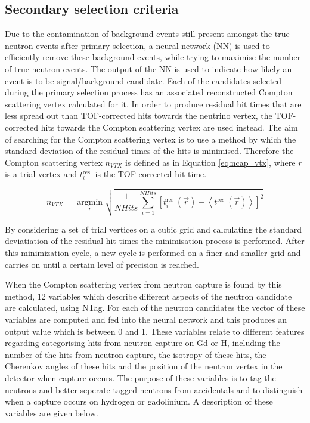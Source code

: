 \subsection{Secondary selection criteria}
Due to the contamination of background events still present amongst the true neutron events after primary selection, a neural network (NN) is used to efficiently remove these background events, while trying to maximise the number of true neutron events. The output of the NN is used to indicate how likely an event is to be signal/background candidate. Each of the candidates selected during the primary selection process has an associated reconstructed Compton scattering vertex calculated for it. In order to produce residual hit times that are less spread out than TOF-corrected hits towards the neutrino vertex, the TOF-corrected hits towards the Compton scattering vertex are used instead. The aim of searching for the Compton scattering vertex is to use a method by which the standard deviation of the residual times of the hits is minimised. Therefore the Compton scattering vertex $n_{VTX}$ is defined as in Equation \ref{eq:ncap_vtx}, where $r$ is a trial vertex and $t_i^{\text {res }}$ is the TOF-corrected hit time.

\begin{equation}
    n_{VTX}=\underset{r}{\operatorname{argmin}}\sqrt{\frac{1}{NHits} \sum_{i=1}^{NHits}\left[t_i^{\text {res }}(\vec{r})-\left\langle t^{\text {res }}(\vec{r})\right\rangle\right]^2}
\label{eq:ncap_vtx}
\end{equation}

 

By considering a set of trial vertices on a cubic grid and calculating the standard deviatiation of the residual hit times the minimisation process is performed. After this minimization cycle, a new cycle is performed on a finer and smaller grid and carries on until a certain level of precision is reached. 

When the Compton scattering vertex from neutron capture is found by this method, 12 variables which describe different aspects of the neutron candidate are calculated, using NTag. For each of the neutron candidates the vector of these variables are computed and fed into the neural network and this produces an output value which is between 0 and 1. These variables relate to different features regarding categorising hits from neutron capture on Gd or H, including the number of the hits from neutron capture, the isotropy of these hits, the Cherenkov angles of these hits and the position of the neutron vertex in the detector when capture occurs. The purpose of these variables is to tag the neutrons and better seperate tagged neutrons from accidentals and to distinguish when a capture occurs on hydrogen or gadolinium. A description of these variables are given below.


